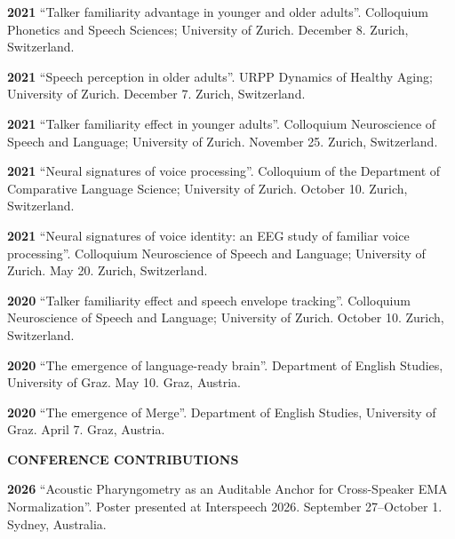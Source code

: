 \documentclass[11pt]{article}
\newcommand{\hangpara}{
 \setlength{\parindent}{0in} %
 \hangindent=0.42in %
}
\begin{document}
\vskip 6pt
\hangpara
{\bf 2021}\hspace{1ex} “Talker familiarity advantage in younger and older adults”. Colloquium Phonetics and Speech Sciences; University of Zurich. December 8. Zurich, Switzerland.

\vskip 6pt
\hangpara
{\bf 2021}\hspace{1ex} “Speech perception in older adults”. URPP Dynamics of Healthy Aging; University of Zurich. December 7. Zurich, Switzerland.

\vskip 6pt
\hangpara
{\bf 2021}\hspace{1ex} “Talker familiarity effect in younger adults”. Colloquium Neuroscience of Speech and Language; University of Zurich. November 25. Zurich, Switzerland.

\vskip 6pt
\hangpara
{\bf 2021}\hspace{1ex} “Neural signatures of voice processing”. Colloquium of the Department of Comparative Language Science; University of Zurich. October 10. Zurich, Switzerland.

\vskip 6pt
\hangpara
{\bf 2021}\hspace{1ex} “Neural signatures of voice identity: an EEG study of familiar voice processing”. Colloquium Neuroscience of Speech and Language; University of Zurich. May 20. Zurich, Switzerland.

\vskip 6pt
\hangpara
{\bf 2020}\hspace{1ex} “Talker familiarity effect and speech envelope tracking”. Colloquium Neuroscience of Speech and Language; University of Zurich. October 10. Zurich, Switzerland.

\vskip 6pt
\hangpara
{\bf 2020}\hspace{1ex} “The emergence of language-ready brain”. Department of English Studies, University of Graz. May 10. Graz, Austria.

\vskip 6pt
\hangpara
{\bf 2020}\hspace{1ex} “The emergence of Merge”. Department of English Studies, University of Graz. April 7. Graz, Austria.





\vskip 20pt
\begin{flushleft}
{\bf CONFERENCE CONTRIBUTIONS}
\end{flushleft}

\vskip 6pt
\hangpara
{\bf 2026}\hspace{1ex} “Acoustic Pharyngometry as an Auditable Anchor for Cross-Speaker EMA Normalization”. Poster presented at Interspeech 2026. September 27--October 1. Sydney, Australia.
\end{document}
